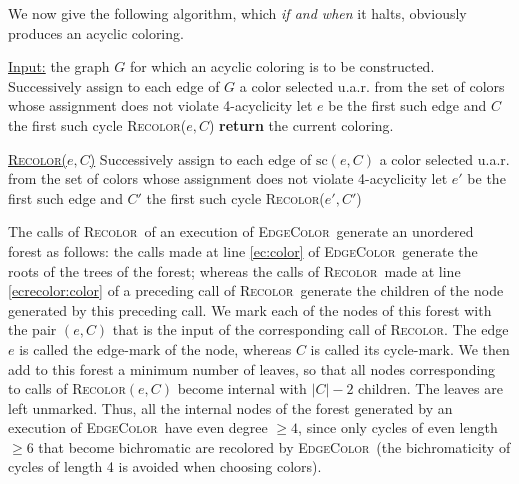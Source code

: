 \documentclass{amsart}
\theoremstyle{plain}
\newcommand{\EC}{\textsc{EdgeColor}}
\newcommand{\Recolor}{\textsc{Recolor}}
\newcommand{\sco}{\mathrm{sc}}
\begin{document}
We now give the following algorithm, which {\it if and when} it halts, obviously produces an acyclic coloring.

\begin{algorithm}[H]
\caption{\EC}\label{alg:ec}
\vspace{0.1cm}
\begin{algorithmic}[1]
\Statex \underline{Input:} the graph $G$ for which an acyclic coloring is to be constructed.
\State Successively assign to each edge of $G$  a color selected u.a.r. from the set of  \Statex \hspace{3.6em} colors whose assignment  does not violate 4-acyclicity  \label{ec:color}
 \label{ec:while}
\State let $e$ be the first such edge and $C$ the first such cycle 
\State \Recolor($e,C$)\label{ec:recolor}
\EndWhile\label{ec:endwhile}
\State \textbf{return} the current coloring.
\end{algorithmic}
\begin{algorithmic}[1]
\vspace{0.1cm}
\Statex \underline{\Recolor($e, C$)} 
\State Successively assign to  each edge of $\sco(e,C)$  a color selected u.a.r. from the set   \Statex \hspace{3.6em} of colors whose assignment  does not violate 4-acyclicity \label{ecrecolor:color}
\While{$\sco(e,C)$ shares an edge with a bichromatic cycle} 
\State let $e'$ be the first such edge and $C'$ the first such cycle 
\label{ecrecolor:while}
\State \Recolor($e', C'$)\label{ecrecolor:recolor}
\EndWhile\label{ecrecolor:endwhile}
\end{algorithmic}
\end{algorithm}





The calls of   \Recolor\ of an   execution of \EC\  generate  an unordered   forest  as follows:
the calls made at line \ref{ec:color} of \EC\ generate the roots of the trees of the forest;    whereas the calls of \Recolor\ made at line \ref{ecrecolor:color} of a preceding call of \Recolor\ generate the children of the node generated by  this preceding call. We mark each of the nodes of this forest with the pair $(e,C)$ that is the input of the corresponding call of \Recolor. The edge $e$ is called the edge-mark of the node, whereas $C$ is called its cycle-mark.  We then add to this forest a minimum number of leaves,  so that all nodes corresponding to calls of \Recolor$(e,C)$ become internal with $|C|-2$ children. The leaves are left unmarked.   Thus,  all the internal nodes of the forest generated by an execution of \EC\ have even degree $\geq 4$, since only cycles of even length $\geq 6$ that become bichromatic are recolored by \EC\ (the bichromaticity of cycles of length 4 is avoided when choosing colors).
\end{document}
